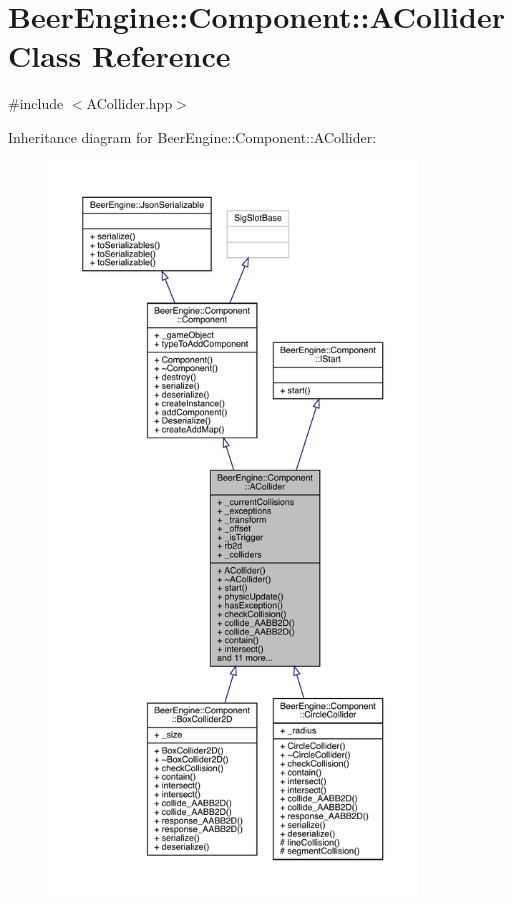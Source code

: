 \hypertarget{class_beer_engine_1_1_component_1_1_a_collider}{}\section{Beer\+Engine\+:\+:Component\+:\+:A\+Collider Class Reference}
\label{class_beer_engine_1_1_component_1_1_a_collider}


{\ttfamily \#include $<$A\+Collider.\+hpp$>$}



Inheritance diagram for Beer\+Engine\+:\+:Component\+:\+:A\+Collider\+:\nopagebreak
\begin{figure}[H]
\begin{center}
\leavevmode
\includegraphics[height=550pt]{class_beer_engine_1_1_component_1_1_a_collider__inherit__graph}
\end{center}
\end{figure}


